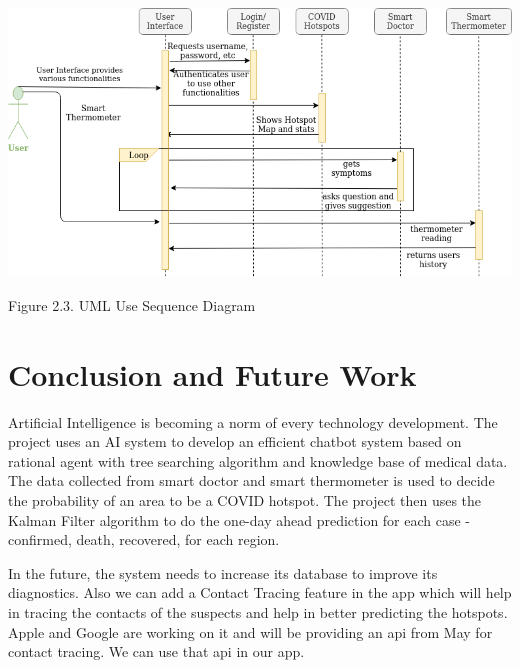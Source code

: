 \documentclass[10pt,twocolumn,letterpaper]{article}
\begin{document}
\begin{center}
\includegraphics[width=1\linewidth]{images/uml_sequence_diagram.png}
\caption{Figure 2.3. UML Use Sequence Diagram}
\end{center}

\section{Conclusion and Future Work}

Artificial Intelligence is becoming a norm of every technology development. The project uses an AI system to develop an efficient chatbot system based on rational agent with tree searching algorithm and knowledge base of medical data. The data collected from smart doctor and smart thermometer is used to decide the probability of an area to be a COVID hotspot. The project then uses the Kalman Filter algorithm to do the one-day ahead prediction for each case - confirmed, death, recovered, for each region.


In the future, the system needs to increase its database to improve its diagnostics. Also we can add a Contact Tracing feature in the app which will help in tracing the contacts of the suspects and help in better predicting the hotspots. Apple and Google are working on it and will be providing an api from May for contact tracing. We can use that api in our app.~\cite{contact-tracing}


{\small


}
\end{document}
